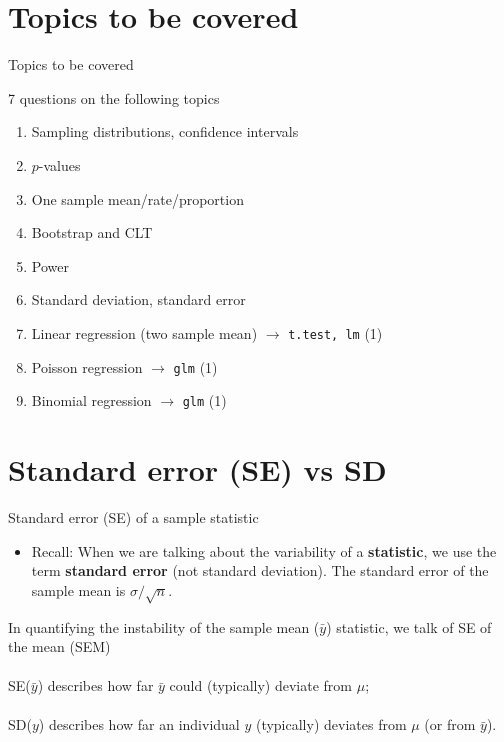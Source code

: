 \documentclass[handout]{beamer}\usepackage[]{graphicx}\usepackage[]{color}
\begin{document}
\section{Topics to be covered}

\begin{frame}{Topics to be covered}

7 questions on the following topics

\begin{enumerate}
	\setlength\itemsep{.51em}
	\item Sampling distributions, confidence intervals
	\item $p$-values 
	\item One sample mean/rate/proportion 
	\item Bootstrap and CLT
	\item Power
	\item Standard deviation, standard error
	\item Linear regression (two sample mean) $\to$ \texttt{t.test, lm} (1)
	\item Poisson regression $\to$ \texttt{glm} (1)
	\item Binomial regression $\to$ \texttt{glm} (1) 
\end{enumerate}

\end{frame}


\section{Standard error (SE) vs SD}



\begin{frame}{Standard error (SE) of a sample statistic}
\begin{itemize}
\item Recall: When we are talking about the variability of a
\textbf{statistic}, we use the term \textbf{standard error} (not
standard deviation). The standard error of the sample mean is $\sigma/\sqrt{n}$.
\end{itemize}


\begin{remarkm}[SE vs. SD]
\begin{center}
	In quantifying the instability of the sample mean ($\bar{y}$) statistic,
	we talk of SE of the mean (SEM) \\ \ \\
	SE($\bar{y}$) describes how far $\bar{y}$ could (typically) deviate from $\mu$; \\ \ \\
	SD($y$) describes how far an individual $y$ (typically) deviates from $\mu$ (or from $\bar{y}$).
\end{center}
\end{remarkm}	


\end{frame}
\end{document}
